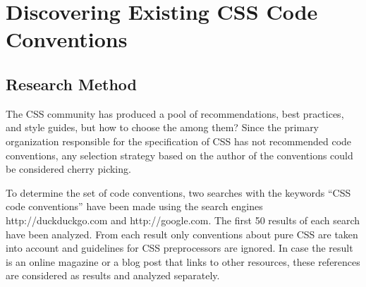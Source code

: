 \documentclass[parskip=full]{uvamscse}
\begin{document}

\chapter{Discovering Existing CSS Code Conventions}

\section{Research Method}

The CSS community has produced a pool of recommendations, best practices, and style guides, but how
to choose the among them? Since the primary organization responsible for the specification of CSS
has not recommended code conventions, any selection strategy based on the author of the conventions
could be considered cherry picking.

To determine the set of code conventions, two searches with the keywords “CSS code conventions” have
been made using the search engines http://duckduckgo.com and http://google.com. The first 50 results
of each search have been analyzed. From each result only conventions about pure CSS are taken into
account and guidelines for CSS preprocessors are ignored. In case the result is an online magazine
or a blog post that links to other resources, these references are considered as results and
analyzed separately.
\end{document}
